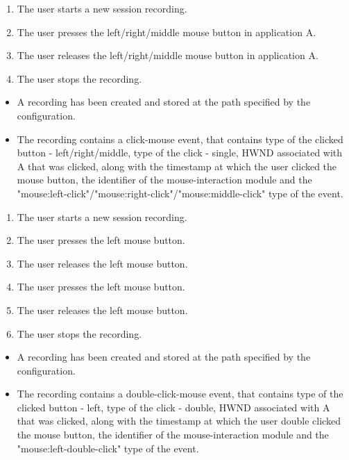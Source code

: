 \begin{tests}
	{\begin{enumerate}
		\item The user starts a new session recording.
		\item The user presses the left/right/middle mouse button in application A.
		\item The user releases the left/right/middle mouse button in application A.
		\item The user stops the recording.
	\end{enumerate}}
	{\begin{itemize}
		\item A recording has been created and stored at the path specified by the configuration.
		\item The recording contains a click-mouse event, that contains type of the clicked button - left/right/middle, type of the click - single, HWND associated with A that was clicked, along with the timestamp at which the user clicked the mouse button, the identifier of the mouse-interaction module and the "mouse:left-click"/"mouse:right-click"/"mouse:middle-click" type of the event.
	\end{itemize}}
	
	{\begin{enumerate}
		\item The user starts a new session recording.
		\item The user presses the left mouse button.
		\item The user releases the left mouse button.
		\item The user presses the left mouse button.
		\item The user releases the left mouse button.
		\item The user stops the recording.
	\end{enumerate}}
	{\begin{itemize}
		\item A recording has been created and stored at the path specified by the configuration.
		\item The recording contains a double-click-mouse event, that contains type of the clicked button - left, type of the click - double, HWND associated with A that was clicked, along with the timestamp at which the user double clicked the mouse button, the identifier of the mouse-interaction module and the "mouse:left-double-click" type of the event.
	\end{itemize}}
	

\end{tests}
